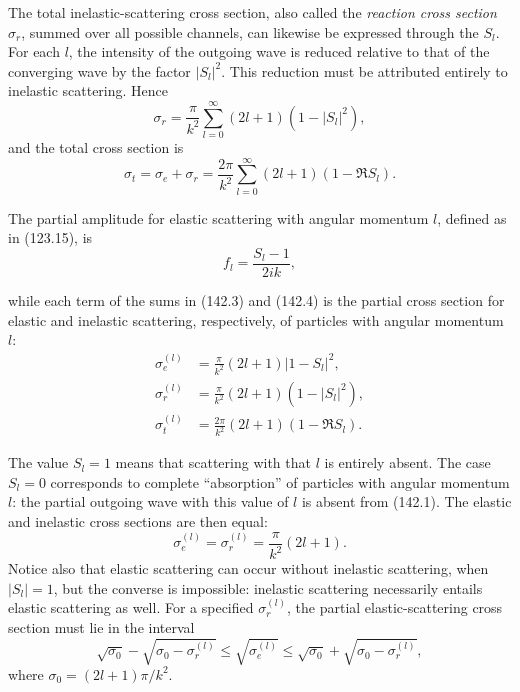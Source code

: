 The total inelastic-scattering cross section, also called the \emph{reaction cross section} $\sigma_r$, summed over all possible channels, can likewise be expressed through the $S_l$. For each $l$, the intensity of the outgoing wave is reduced relative to that of the converging wave by the factor $|S_l|^2$. This reduction must be attributed entirely to inelastic scattering. Hence
\begin{equation}
 \sigma_r=\frac{\pi}{k^2}\sum_{l=0}^{\infty}(2l+1)(1-|S_l|^2),
 \tag{142.4}
\end{equation}
and the total cross section is
\begin{equation}
 \sigma_t=\sigma_e+\sigma_r=\frac{2\pi}{k^2}\sum_{l=0}^{\infty}(2l+1)(1-\Re S_l).
 \tag{142.5}
\end{equation}

The partial amplitude for elastic scattering with angular momentum $l$, defined as in (123.15), is
\begin{equation}
 f_l=\frac{S_l-1}{2ik},
 \tag{142.6}
\end{equation}

while each term of the sums in (142.3) and (142.4) is the partial cross section for elastic and inelastic scattering, respectively, of particles with angular momentum $l$:
\begin{equation}
 \begin{aligned}
 \sigma_e^{(l)}&=\frac{\pi}{k^2}(2l+1)|1-S_l|^2,\\
 \sigma_r^{(l)}&=\frac{\pi}{k^2}(2l+1)(1-|S_l|^2),\\
 \sigma_t^{(l)}&=\frac{2\pi}{k^2}(2l+1)(1-\Re S_l).
 \end{aligned}
 \tag{142.7}
\end{equation}

The value $S_l=1$ means that scattering with that $l$ is entirely absent. The case $S_l=0$ corresponds to complete ``absorption'' of particles with angular momentum $l$: the partial outgoing wave with this value of $l$ is absent from (142.1). The elastic and inelastic cross sections are then equal:
\begin{equation}
 \sigma_e^{(l)}=\sigma_r^{(l)}=\frac{\pi}{k^2}(2l+1).
 \tag{142.8}
\end{equation}
Notice also that elastic scattering can occur without inelastic scattering, when $|S_l|=1$, but the converse is impossible: inelastic scattering necessarily entails elastic scattering as well. For a specified $\sigma_r^{(l)}$, the partial elastic-scattering cross section must lie in the interval
\begin{equation}
 \sqrt{\sigma_0}-\sqrt{\sigma_0-\sigma_r^{(l)}}\leq
 \sqrt{\sigma_e^{(l)}}\leq
 \sqrt{\sigma_0}+\sqrt{\sigma_0-\sigma_r^{(l)}},
 \tag{142.9}
\end{equation}
where $\sigma_0=(2l+1)\pi/k^2$.

